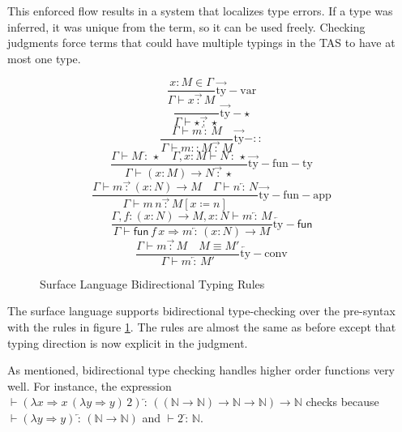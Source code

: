This enforced flow results in a system that localizes type errors.
If a type was inferred, it was unique from the term, so it can be used freely.
Checking judgments force terms that could have multiple typings in the TAS to have at most one type.


\begin{figure}
\[
\frac{x:M\in\Gamma}{\Gamma\vdash x\overrightarrow{\,:\,}M}\operatorname{\overrightarrow{ty}-var}
\]
\[
\frac{\,}{\Gamma\vdash\star\overrightarrow{\,:\,}\star}\operatorname{\overrightarrow{ty}-\star}
\]
\[
\frac{\Gamma\vdash m\overleftarrow{\,:\,}M}{\Gamma\vdash m::M\overrightarrow{\,:\,}M}\operatorname{\overrightarrow{ty}-::}
\]
\[
\frac{\Gamma\vdash M\overleftarrow{\,:\,}\star\quad\Gamma,x:M\vdash N\overleftarrow{\,:\,}\star}{\Gamma\vdash\left(x:M\right)\rightarrow N\overrightarrow{\,:\,}\star}\operatorname{\overrightarrow{ty}-fun-ty}
\]
\[
\frac{\Gamma\vdash m\overrightarrow{\,:\,}\left(x:N\right)\rightarrow M\quad\Gamma\vdash n\overleftarrow{\,:\,}N}{\Gamma\vdash m\,n\overrightarrow{\,:\,}M\left[x\coloneqq n\right]}\operatorname{\overrightarrow{ty}-fun-app}
\]
\[
\frac{\Gamma,f:\left(x:N\right)\rightarrow M,x:N\vdash m\overleftarrow{\,:\,}M}{\Gamma\vdash\mathsf{fun}\,f\,x\Rightarrow m\overleftarrow{\,:\,}\left(x:N\right)\rightarrow M}\operatorname{\overleftarrow{ty}-\mathsf{fun}}
\]
\[
\frac{\Gamma\vdash m\overrightarrow{\,:\,}M\quad M\equiv M'}{\Gamma\vdash m\overleftarrow{\,:\,}M'}\operatorname{\overleftarrow{ty}-conv}
\]

\caption{Surface Language Bidirectional Typing Rules}
\label{fig:surface-bityping-rules}
\end{figure}
    

The surface language supports bidirectional type-checking over the pre-syntax with the rules in figure \ref{fig:surface-bityping-rules}.
The rules are almost the same as before except that typing direction is now explicit in the judgment.

As mentioned, bidirectional type checking handles higher order functions very well.
For instance, the expression $\vdash(\lambda x\Rightarrow x\,(\lambda y\Rightarrow y)\,2)\overleftarrow{\,:\,}\left(\left(\mathbb{N}\rightarrow\mathbb{N}\right)\rightarrow\mathbb{N}\rightarrow\mathbb{N}\right)\rightarrow\mathbb{N}$ checks because $\vdash(\lambda y\Rightarrow y)\overleftarrow{\,:\,}\left(\mathbb{N}\rightarrow\mathbb{N}\right)$ and $\vdash2\overleftarrow{\,:\,}\mathbb{N}$.


